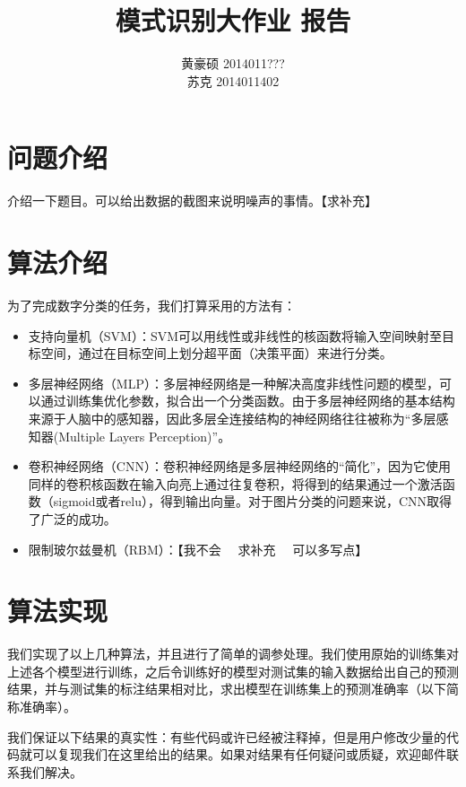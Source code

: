 \documentclass[UTF8]{ctexart}
\title{模式识别大作业 报告}
\author{黄豪硕 2014011??? \\ 苏克 2014011402}
\begin{document}
	
\maketitle

\section{问题介绍}

介绍一下题目。可以给出数据的截图来说明噪声的事情。【求补充】

\section{算法介绍}

为了完成数字分类的任务，我们打算采用的方法有：

\begin{itemize}
	\item 支持向量机（SVM）：SVM可以用线性或非线性的核函数将输入空间映射至目标空间，通过在目标空间上划分超平面（决策平面）来进行分类。
	
	\item 多层神经网络（MLP）：多层神经网络是一种解决高度非线性问题的模型，可以通过训练集优化参数，拟合出一个分类函数。由于多层神经网络的基本结构来源于人脑中的感知器，因此多层全连接结构的神经网络往往被称为“多层感知器(Multiple Layers Perception)”。
	
	\item 卷积神经网络（CNN）：卷积神经网络是多层神经网络的“简化”，因为它使用同样的卷积核函数在输入向亮上通过往复卷积，将得到的结果通过一个激活函数（sigmoid或者relu），得到输出向量。对于图片分类的问题来说，CNN取得了广泛的成功。
	
	\item 限制玻尔兹曼机（RBM）：【我不会~~ 求补充~~ 可以多写点】
\end{itemize}

\section{算法实现}

我们实现了以上几种算法，并且进行了简单的调参处理。我们使用原始的训练集对上述各个模型进行训练，之后令训练好的模型对测试集的输入数据给出自己的预测结果，并与测试集的标注结果相对比，求出模型在训练集上的预测准确率（以下简称准确率）。

我们保证以下结果的真实性：有些代码或许已经被注释掉，但是用户修改少量的代码就可以复现我们在这里给出的结果。如果对结果有任何疑问或质疑，欢迎邮件联系我们解决。
\end{document}
